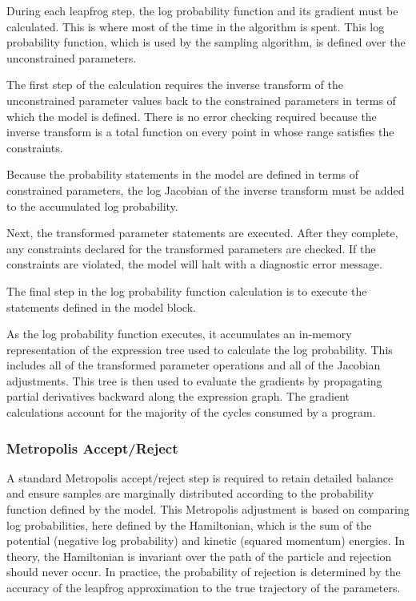 \documentclass[article]{jss}
\begin{document}
During each leapfrog step, the log probability function and its
gradient must be calculated.  This is where most of the time in the
 algorithm is spent.  This log probability function, which is
used by the sampling algorithm, is defined over the unconstrained
parameters.

The first step of the calculation requires the inverse transform of
the unconstrained parameter values back to the constrained parameters
in terms of which the model is defined.  There is no error checking
required because the inverse transform is a total function on every point
in whose range satisfies the constraints.

Because the probability statements in the model are defined in terms
of constrained parameters, the log Jacobian of the inverse transform
must be added to the accumulated log probability.

Next, the transformed parameter statements are executed.  After they
complete, any constraints declared for the transformed parameters are
checked.  If the constraints are violated, the model will halt with a
diagnostic error message.

The final step in the log probability function calculation is to
execute the statements defined in the model block.  

As the log probability function executes, it accumulates an in-memory
representation of the expression tree used to calculate the log
probability.  This includes all of the transformed parameter
operations and all of the Jacobian adjustments.  This tree is then
used to evaluate the gradients by propagating partial derivatives
backward along the expression graph.  The gradient calculations
account for the majority of the cycles consumed by a  program.

\subsubsection{Metropolis Accept/Reject}

A standard Metropolis accept/reject step is required to retain detailed
balance and ensure samples are marginally distributed according to the
probability function defined by the model.  This Metropolis adjustment
is based on comparing log probabilities, here defined by the
Hamiltonian, which is the sum of the potential (negative log
probability) and kinetic (squared momentum) energies.  In theory, the
Hamiltonian is invariant over the path of the particle and rejection
should never occur.  In practice, the probability of rejection is
determined by the accuracy of the leapfrog approximation to the true
trajectory of the parameters.
\end{document}
